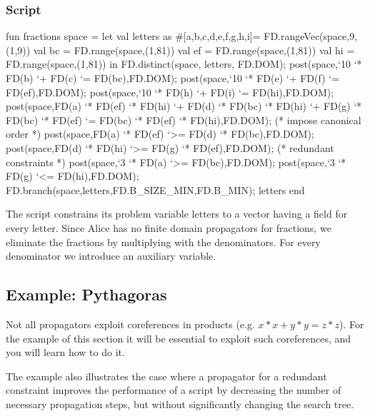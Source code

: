 \documentclass[a4paper,halfparskip]{scrartcl}
\begin{document}
\subsubsection{Script}
\begin{myverbatim}
fun fractions space =
        let 
            val letters as #[a,b,c,d,e,f,g,h,i]=
                FD.rangeVec(space,9,(1,9))
            val bc = FD.range(space,(1,81))
            val ef = FD.range(space,(1,81))
            val hi = FD.range(space,(1,81))
        in
            FD.distinct(space, letters, FD.DOM);
            post(space,`10 `* FD(b) `+ FD(c) `= FD(bc),FD.DOM);
            post(space,`10 `* FD(e) `+ FD(f) `= FD(ef),FD.DOM);
            post(space,`10 `* FD(h) `+ FD(i) `= FD(hi),FD.DOM);   
            post(space,FD(a) `* FD(ef) `* FD(hi) `+
                       FD(d) `* FD(bc) `* FD(hi) `+
                       FD(g) `* FD(bc) `* FD(ef) `= 
                       FD(bc) `* FD(ef) `* FD(hi),FD.DOM);
            (* impose canonical order *)
            post(space,FD(a) `* FD(ef) `>= FD(d) `* FD(bc),FD.DOM);
            post(space,FD(d) `* FD(hi) `>= FD(g) `* FD(ef),FD.DOM);
            (* redundant constraints *)
            post(space,`3 `* FD(a) `>= FD(bc),FD.DOM);
            post(space,`3 `* FD(g) `<= FD(hi),FD.DOM);
            FD.branch(space,letters,FD.B_SIZE_MIN,FD.B_MIN);
            {letters}  
       end     
\end{myverbatim}

The script constrains its problem variable letters to a vector 
having a field for every letter. Since Alice has no finite domain 
propagators for fractions, we eliminate the fractions by multiplying 
with the denominators. For every denominator we introduce an auxiliary 
variable. 


\newpage
\subsection{Example: Pythagoras}
Not all propagators exploit coreferences in products 
(e.g. $ x * x + y * y = z * z $). For the example of 
this section it will be essential to exploit such 
coreferences, and you will learn how to do it.

The example also illustrates the case where a propagator 
for a redundant constraint improves the performance of a 
script by decreasing the number of necessary propagation 
steps, but without significantly changing the search tree. 
\end{document}
